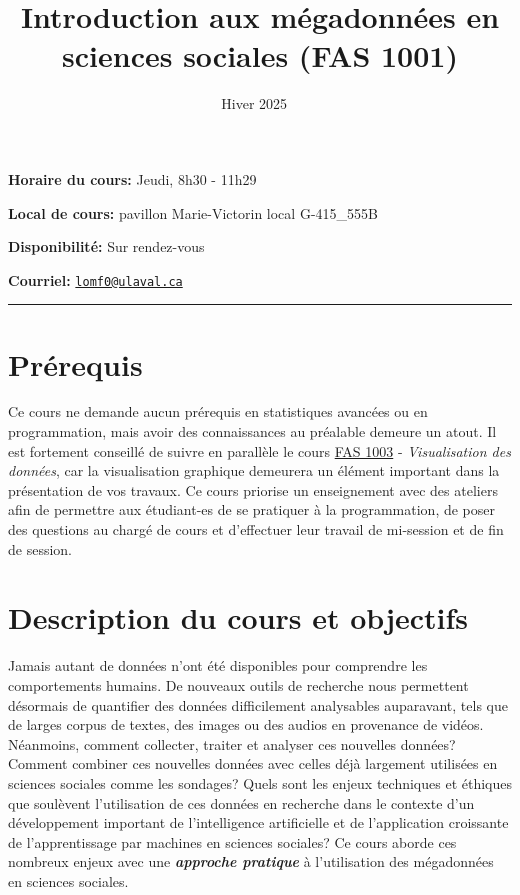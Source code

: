 \documentclass[
  letterpaper,
  DIV=11,
  numbers=noendperiod]{scrartcl}
\title{Introduction aux mégadonnées en sciences sociales (FAS 1001)}
\author{Hiver 2025 ~}
\date{}
\begin{document}
\maketitle

\textbf{Horaire du cours:} Jeudi, 8h30 - 11h29

\textbf{Local de cours:} pavillon Marie-Victorin local G-415\_555B

\textbf{Disponibilité:} Sur rendez-vous

\textbf{Courriel:}
\href{mailto:lomf0@ulaval.ca}{\nolinkurl{lomf0@ulaval.ca}}

\rule{\textwidth}{2pt}

\section{Prérequis}\label{pruxe9requis}

Ce cours ne demande aucun prérequis en statistiques avancées ou en
programmation, mais avoir des connaissances au préalable demeure un
atout. Il est fortement conseillé de suivre en parallèle le cours
\href{https://florencevdubois.github.io/teaching.html}{FAS 1003} -
\emph{Visualisation des données}, car la visualisation graphique
demeurera un élément important dans la présentation de vos travaux. Ce
cours priorise un enseignement avec des ateliers afin de permettre aux
étudiant-es de se pratiquer à la programmation, de poser des questions
au chargé de cours et d'effectuer leur travail de mi-session et de fin
de session.

\section{Description du cours et
objectifs}\label{description-du-cours-et-objectifs}

Jamais autant de données n'ont été disponibles pour comprendre les
comportements humains. De nouveaux outils de recherche nous permettent
désormais de quantifier des données difficilement analysables
auparavant, tels que de larges corpus de textes, des images ou des
audios en provenance de vidéos. Néanmoins, comment collecter, traiter et
analyser ces nouvelles données? Comment combiner ces nouvelles données
avec celles déjà largement utilisées en sciences sociales comme les
sondages? Quels sont les enjeux techniques et éthiques que soulèvent
l'utilisation de ces données en recherche dans le contexte d'un
développement important de l'intelligence artificielle et de
l'application croissante de l'apprentissage par machines en sciences
sociales? Ce cours aborde ces nombreux enjeux avec une
\textbf{\emph{approche pratique}} à l'utilisation des mégadonnées en
sciences sociales.
\end{document}
